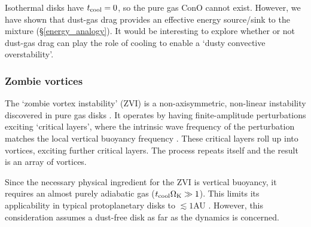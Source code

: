 Isothermal disks have $t_\mathrm{cool}=0$, so the pure gas ConO cannot
exist. However, we have shown that dust-gas drag provides an effective
energy source/sink to the mixture (\S\ref{energy_analogy}). It would be
interesting to explore whether or not dust-gas drag can play the role
of cooling to enable a `dusty convective 
overstability'. 







\subsubsection{Zombie vortices}

The `zombie vortex instability' (ZVI) is a non-axisymmetric,
non-linear instability discovered in pure gas disks
\citep{marcus15,umurhan16d}. It operates by having finite-amplitude perturbations
exciting `critical layers',  where the intrinsic wave frequency of the
perturbation matches the local vertical buoyancy frequency 
\citep{marcus13}. These critical layers roll 
up into vortices, exciting further critical layers. The process
repeats itself and the result is an array of vortices. 

Since the necessary physical ingredient for the ZVI is vertical
buoyancy, it requires an almost purely adiabatic gas ($t_\mathrm{cool}\Omega_{\rm K}\gg
1$). This limits its applicability in typical protoplanetary disks to 
$\lesssim 1$AU \citep{lesur16, malygin17}. However, this consideration
assumes a dust-free disk as far as the dynamics is concerned. 

